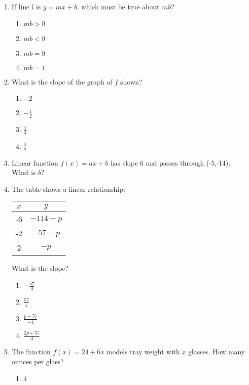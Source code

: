 \documentclass[12pt]{exam}
\begin{document}
\begin{enumerate}
\begin{enumerate}[label=\Alph*)]
    \end{enumerate}
    \item If line $l$ is $y = mx + b$, which must be true about $mb$?
    \begin{enumerate}[label=\Alph*)]
        \item $mb > 0$
        \item $mb < 0$
        \item $mb = 0$
        \item $mb = 1$
    \end{enumerate}
    \item What is the slope of the graph of $f$ shown?
    \begin{enumerate}[label=\Alph*)]
        \item $-2$
        \item $-\frac{1}{2}$
        \item $\frac{1}{4}$
        \item $\frac{1}{2}$
    \end{enumerate}
    \item Linear function $f(x) = ax + b$ has slope 6 and passes through (-5,-14). What is $b$?
    \item The table shows a linear relationship:
    \begin{center}
        \begin{tabular}{|c|c|}
            \hline
            $x$ & $y$ \\
            \hline
            -6 & $-114 - p$ \\
            -2 & $-57 - p$ \\
            2 & $-p$ \\
            \hline
        \end{tabular}
    \end{center}
    What is the slope?
    \begin{enumerate}[label=\Alph*)]
        \item $-\frac{57}{4}$
        \item $\frac{57}{4}$
        \item $\frac{p - 57}{-4}$
        \item $\frac{2p + 57}{4}$
    \end{enumerate}
    \item The function $f(x) = 24 + 6x$ models tray weight with $x$ glasses. How many ounces per glass?
    \begin{enumerate}[label=\Alph*)]
        \item 4

\end{enumerate}
\end{enumerate}
\end{document}
